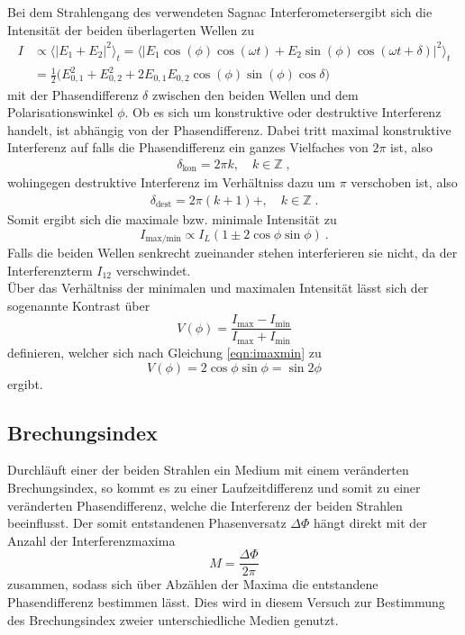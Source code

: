Bei dem Strahlengang des verwendeten Sagnac Interferometersergibt sich die Intensität der beiden überlagerten Wellen zu
\begin{align}
  I &\propto \langle \lvert
  E_1+E_2 \rvert^2 \rangle_t =
  \langle \lvert E_1 \cos{(\phi)}\cos{(\omega t)} + E_2 \sin{(\phi)}\cos{(\omega t + \delta)} \rvert^2 \rangle_t \\
  &= \frac{1}{2} \bigl( E_{0,1}^2 + E_{0,2}^2 + 2E_{0,1}E_{0,2}\cos(\phi)\sin(\phi)\cos{\delta} \bigr)
\end{align}
mit der Phasendifferenz $\delta$ zwischen den beiden Wellen und dem  Polarisationswinkel $\phi$.
Ob es sich um konstruktive oder destruktive Interferenz handelt, ist abhängig von der Phasendifferenz.
Dabei tritt maximal konstruktive Interferenz auf falls die Phasendifferenz ein ganzes Vielfaches von $2\pi$
ist, also
\begin{align*}
  \delta_{\text{kon}}=2\pi k, \quad k \in \mathbb{Z} \; ,
\end{align*}
wohingegen destruktive Interferenz im Verhältniss dazu um $\pi$ verschoben ist, also
\begin{align*}
  \delta_{\text{dest}}=2\pi(k+1) + , \quad k \in \mathbb{Z}  \; .
\end{align*}
Somit ergibt sich die maximale bzw. minimale Intensität zu
\begin{equation}
  I_{\text{max/min}} \propto I_{L}(1\pm 2\cos{\phi}\sin{\phi}) \: .
  \label{eqn:imaxmin}
\end{equation}
Falls die beiden Wellen senkrecht zueinander stehen
interferieren sie nicht, da der Interferenzterm $I_{12}$ verschwindet.\\
Über das Verhältniss der minimalen und maximalen Intensität lässt sich der sogenannte Kontrast
über
\begin{equation}
  V(\phi)= \frac{I_{\text{max}}-I_{\text{min}}}{I_{\text{max}}+I_{\text{min}}}
\end{equation}
definieren, welcher sich nach Gleichung \eqref{eqn:imaxmin} zu
\begin{equation}
  V(\phi)=2\cos{\phi}\sin{\phi}=\sin{2\phi}
\end{equation}
ergibt.
\subsection{Brechungsindex}

Durchläuft einer der beiden Strahlen ein Medium mit einem veränderten Brechungsindex, so
kommt es zu einer Laufzeitdifferenz und somit zu einer veränderten Phasendifferenz,
welche die Interferenz der beiden Strahlen beeinflusst.
Der somit entstandenen Phasenversatz $\Delta \Phi$
hängt direkt mit der Anzahl der Interferenzmaxima
\begin{equation}
  M=\frac{\Delta \Phi}{2\pi}
  \label{eqn:AnzMax}
\end{equation}
zusammen, sodass sich über Abzählen der Maxima die entstandene Phasendifferenz bestimmen lässt.
Dies wird in diesem Versuch zur Bestimmung des Brechungsindex zweier unterschiedliche Medien genutzt.

